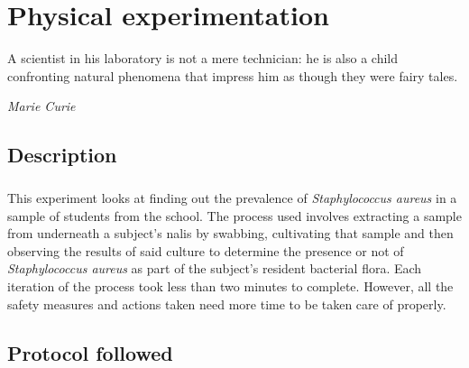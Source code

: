 \chapter{Physical experimentation}
\epigraph{A scientist in his laboratory is not a mere technician: he is also a child confronting natural phenomena that impress him as though they were fairy tales.}{\textit{Marie Curie}}
\section{Description}
\paragraph{}This experiment looks at finding out the prevalence of \emph{Staphylococcus aureus} in a sample of students from the school. The process used involves extracting a sample from underneath a subject's nalis by swabbing, cultivating that sample and then observing the results of said culture to determine the presence or not of \emph{Staphylococcus aureus} as part of the subject's resident bacterial flora. Each iteration of the process took less than two minutes to complete. However, all the safety measures and actions taken need more time to be taken care of properly.
\section{Protocol followed}
